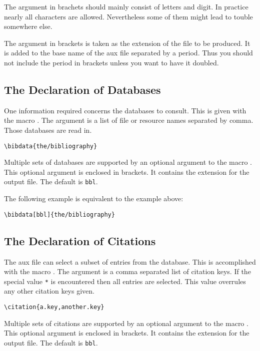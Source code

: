 The argument in brachets should mainly consist of letters and digit.
In practice nearly all characters are allowed. Nevertheless some of
them might lead to touble somewhere else.

The argument in brackets is taken as the extension of the file to be
produced. It is added to the base name of the aux file separated by a
period. Thus you should not include the period in brackets unless you
want to have it doubled.


\subsection{The Declaration of Databases}

One information required concerns the databases to consult. This is
given with the macro . The argument is a list of file
or resource names separated by comma. Those databases are read in.

\begin{lstlisting}[language={[LaTeX]TeX}]
  \bibdata{the/bibliography}
\end{lstlisting}

Multiple sets of databases are supported by an optional argument to
the macro . This optional argument is enclosed in
brackets. It contains the extension for the output file. The default
is \texttt{bbl}.

The following example is equivalent to the example above:

\begin{lstlisting}[language={[LaTeX]TeX}]
  \bibdata[bbl]{the/bibliography}
\end{lstlisting}


\subsection{The Declaration of Citations}

The aux file can select a subset of entries from the database. This is
accomplished with the macro . The argument is a comma
separated list of citation keys. If the special value \verb|*| is
encountered then all entries are selected. This value overrules any
other citation keys given.

\begin{lstlisting}[language={[LaTeX]TeX}]
  \citation{a.key,another.key}
\end{lstlisting}

Multiple sets of citations are supported by an optional argument to
the macro . This optional argument is enclosed in
brackets. It contains the extension for the output file. The default
is \texttt{bbl}.

